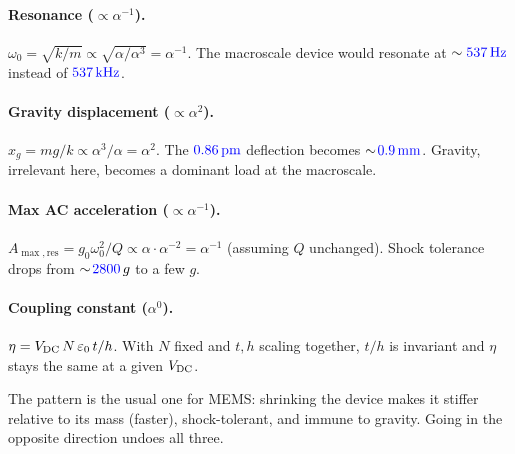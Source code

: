 \paragraph{Resonance ($\propto \alpha^{-1}$).}
$\omega_{0} = \sqrt{k/m} \propto \sqrt{\alpha/\alpha^{3}} = \alpha^{-1}$.
The macroscale device would resonate at $\sim \textcolor{blue}{\SI{537}{\hertz}}$ instead of
$\textcolor{blue}{\SI{537}{\kilo\hertz}}$.

\paragraph{Gravity displacement ($\propto \alpha^{2}$).}
$x_{g} = m g / k \propto \alpha^{3}/\alpha = \alpha^{2}$.
The $\textcolor{blue}{\SI{0.86}{\pico\meter}}$ deflection becomes $\sim\!\textcolor{blue}{\SI{0.9}{\milli\meter}}$.
Gravity, irrelevant here, becomes a dominant load at the macroscale.

\paragraph{Max AC acceleration ($\propto \alpha^{-1}$).}
$A_{\max,\mathrm{res}} = g_{0}\omega_{0}^{2}/Q \propto \alpha\cdot\alpha^{-2}
= \alpha^{-1}$ (assuming $Q$ unchanged). Shock tolerance drops from
$\sim\!\textcolor{blue}{2800}\,g$ to a few $g$.

\paragraph{Coupling constant ($\alpha^{0}$).}
$\eta = V_{\mathrm{DC}}\,N\,\varepsilon_{0}\,t/h$. With $N$ fixed and $t,h$ scaling
together, $t/h$ is invariant and $\eta$ stays the same at a given $V_{\mathrm{DC}}$.

\bigskip
\noindent
The pattern is the usual one for MEMS: shrinking the device makes it stiffer
relative to its mass (faster), shock-tolerant, and immune to gravity. Going
in the opposite direction undoes all three.
